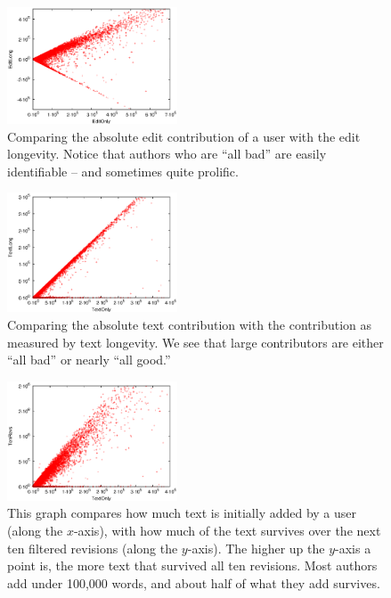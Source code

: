 \begin{figure}[tbph]
    \begin{center}
    \includegraphics[width=0.45\textwidth]{paper-contrib/score-zoom-editonly-editlong}
    \end{center}
    \caption[EditOnly vs EditLong]{
    	Comparing the absolute edit contribution of a user
	with the edit longevity.
	Notice that authors who are ``all bad''
	are easily identifiable -- and sometimes quite prolific.
    }
    \label{fig-zoom-editonly-editlong}
\end{figure}
%
\begin{figure}[tbph]
    \begin{center}
    \includegraphics[width=0.45\textwidth]{paper-contrib/score-zoom-textonly-textlong}
    \end{center}
    \caption[TextOnly vs TextLong]{
    	Comparing the absolute text contribution with the contribution
	as measured by text longevity.
	We see that large contributors are either ``all bad''
	or nearly ``all good.''
    }
    \label{fig-zoom-textonly-textlong}
\end{figure}
%
%
\begin{figure}[tbph]
    \begin{center}
    \includegraphics[width=0.45\textwidth]{paper-contrib/score-zoom-revisions-textonly}
    \end{center}
    \caption[Measuring short term text survival]{
    	This graph compares how much text is initially added
	by a user (along the $x$-axis), with how much
	of the text survives over the next ten filtered revisions
	(along the $y$-axis).
	The higher up the $y$-axis a point is, the more
	text that survived all ten revisions.
	Most authors add under 100,000 words,
	and about half of what they add survives.
    }
    \label{fig-zoom-revisions-textonly}
\end{figure}
